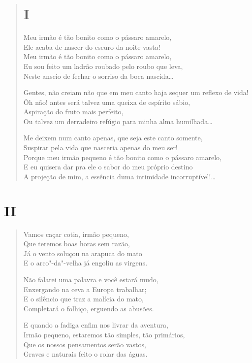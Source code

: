 \begin{verse}
\section*{I}

Meu irmão é tão bonito como o pássaro amarelo,\\
Ele acaba de nascer do escuro da noite vasta!\\
Meu irmão é tão bonito como o pássaro amarelo,\\
Eu sou feito um ladrão roubado pelo roubo que leva,\\
Neste anseio de fechar o sorriso da boca nascida\ldots{}

Gentes, não creiam não que em meu canto haja sequer um reflexo de vida!\\
Ôh não! antes será talvez uma queixa de espírito sábio,\\
Aspiração do fruto mais perfeito,\\
Ou talvez um derradeiro refúgio para minha alma humilhada\ldots{}

Me deixem num canto apenas, que seja este canto somente,\\
Suspirar pela vida que nasceria apenas do meu ser!\\
Porque meu irmão pequeno é tão bonito como o pássaro amarelo,\\
E eu quisera dar pra ele o sabor do meu próprio destino\\
A projeção de mim, a essência duma intimidade incorruptível!\ldots{}
\end{verse}

\medskip
\section*{II}

\begin{verse}
Vamos caçar cotia, irmão pequeno,\\
Que teremos boas horas sem razão,\\
Já o vento soluçou na arapuca do mato\\
E o arco"-da"-velha já engoliu as virgens.

Não falarei uma palavra e você estará mudo,\\
Enxergando na ceva a Europa trabalhar;\\
E o silêncio que traz a malícia do mato,\\
Completará o folhiço, erguendo as abusões.

E quando a fadiga enfim nos livrar da aventura,\\
Irmão pequeno, estaremos tão simples, tão primários,\\
Que os nossos pensamentos serão vastos,\\
Graves e naturais feito o rolar das águas.
\end{verse}

